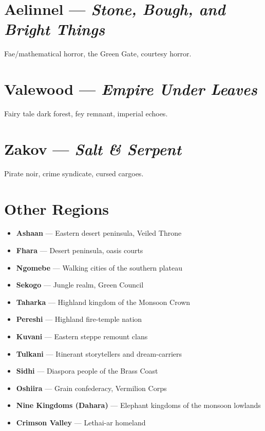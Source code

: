 \documentclass[12pt,oneside]{book}
\begin{document}
\section*{Aelinnel --- \textit{Stone, Bough, and Bright Things}}
Fae/mathematical horror, the Green Gate, courtesy horror.

\section*{Valewood --- \textit{Empire Under Leaves}}
Fairy tale dark forest, fey remnant, imperial echoes.

\section*{Zakov --- \textit{Salt \& Serpent}}
Pirate noir, crime syndicate, cursed cargoes.

\section*{Other Regions}
\begin{itemize}
  \item \textbf{Ashaan} --- Eastern desert peninsula, Veiled Throne
  \item \textbf{Fhara} --- Desert peninsula, oasis courts
  \item \textbf{Ngomebe} --- Walking cities of the southern plateau
  \item \textbf{Sekogo} --- Jungle realm, Green Council
  \item \textbf{Taharka} --- Highland kingdom of the Monsoon Crown
  \item \textbf{Pereshi} --- Highland fire-temple nation
  \item \textbf{Kuvani} --- Eastern steppe remount clans
  \item \textbf{Tulkani} --- Itinerant storytellers and dream-carriers
  \item \textbf{Sidhi} --- Diaspora people of the Brass Coast
  \item \textbf{Oshiira} --- Grain confederacy, Vermilion Corps
  \item \textbf{Nine Kingdoms (Dahara)} --- Elephant kingdoms of the monsoon lowlands
  \item \textbf{Crimson Valley} --- Lethai-ar homeland
\end{itemize}

\end{document}
